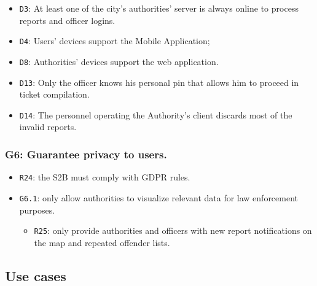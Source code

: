 \documentclass[12pt,a4paper]{article}
\begin{document}
	\begin{itemize}
			\item \texttt{D3}: At least one of the city's authorities' server is always online to process reports and officer logins.
			\item \texttt{D4}: Users' devices support the Mobile Application;
			\item \texttt{D8}: Authorities' devices support the web application.
			\item \texttt{D13}: Only the officer knows his personal pin that allows him to proceed in ticket compilation.
			\item \texttt{D14}: The personnel operating the Authority's client discards most of the invalid reports.
	\end{itemize}

\subsubsection{G6: Guarantee privacy to users.}
	
	\begin{itemize}
	\item \texttt{R24}: the S2B must comply with GDPR rules.
	\item \texttt{G6.1}: only allow authorities to visualize relevant data for law enforcement purposes.
							\begin{itemize}
									\item \texttt{R25}: only provide authorities and officers with new report notifications on the map and repeated offender lists. 
							\end{itemize}
	\end{itemize}

\newpage
\subsection{Use cases}
\end{document}

